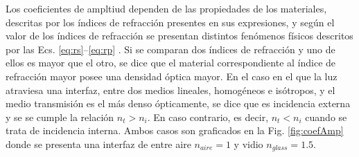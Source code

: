 Los coeficientes  de ampltiud dependen de las propiedades de los materiales, descritas por los índices de refracción presentes en sus expresiones, y según el valor de los índices de refracción se presentan distintos fenómenos físicos descritos por las Ecs. \eqref{eq:rs}--\eqref{eq:rp} . Si se comparan dos índices de refracción y uno de ellos es mayor que el otro, se dice que el material correspondiente al índice de refracción mayor posee una densidad óptica mayor. En el caso en el que la luz atraviesa una interfaz, entre dos medios lineales, homogéneos e isótropos, y el medio transmisión es  el más denso ópticamente, se dice que es incidencia externa y se se cumple la relación $n_t>n_i$. En caso contrario, es decir,  $n_t<n_i$ cuando  se trata de incidencia interna. Ambos casos son graficados en la Fig. \ref{fig:coefAmp} donde se presenta una interfaz de entre aire $n_{aire} = 1$ y vidio $n_{glass} = 1.5$.

